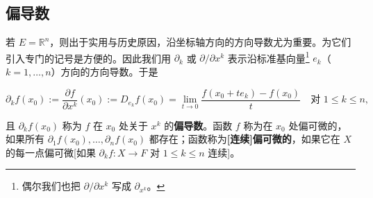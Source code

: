 \subsection*{偏导数}

若 $ E = \mathbb{R}^n $，则出于实用与历史原因，沿坐标轴方向的方向导数尤为重要。为它们引入专门的记号是方便的。因此我们用 $ \partial_k $ 或 $ \partial/\partial x^k $ 表示沿标准基向量\footnote{偶尔我们也把 $ \partial/\partial x^k $ 写成 $ \partial_{x^k} $。} $ e_k $（$ k = 1, \ldots, n $）方向的方向导数。于是

\[
\partial_k f(x_0) := \frac{\partial f}{\partial x^k}(x_0) := D_{e_k} f(x_0) = \lim_{t \to 0} \frac{f(x_0 + te_k) - f(x_0)}{t} \quad \text{对 } 1 \le k \le n ,
\]

且 $ \partial_k f(x_0) $ 称为 $ f $ 在 $ x_0 $ 处关于 $ x^k $ 的\textbf{偏导数}。函数 $ f $ 称为在 $ x_0 $ 处偏可微的，如果所有 $ \partial_1 f(x_0), \ldots, \partial_n f(x_0) $ 都存在；函数称为\textbf{[连续]偏可微的}，如果它在 $ X $ 的每一点偏可微[如果 $ \partial_k f : X \to F $ 对 $ 1 \le k \le n $ 连续]。

